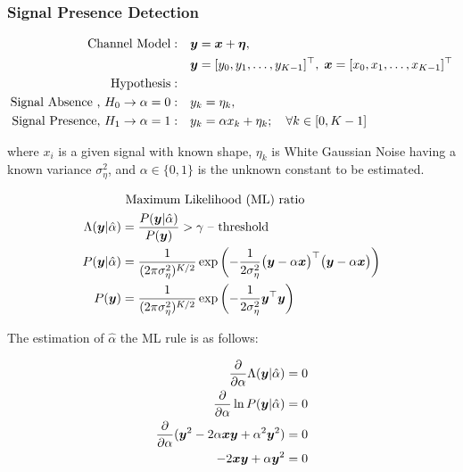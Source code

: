 \documentclass[17pt,a4paper]{extarticle}
\begin{document}
\subsubsection{Signal Presence Detection} 
\begin{linenomath*} 
	\begin{align*}	
		\textrm{Channel~Model}:\quad & {\boldsymbol {y}}= {\boldsymbol {x}} + {\boldsymbol {\eta}},\\
		&{\boldsymbol {y}}=[y_0,y_1,\ldots,y_{K-1}]^{\top},\; 	{\boldsymbol {x}}=[x_0,x_1,\ldots,x_{K-1}]^{\top}\\
		\textrm{Hypothesis}:\quad &\\
		\textrm{Signal~Absence , }H_0 \to \alpha= 0:\quad &y_k = \eta_k,\quad \textrm{}\\
		\textrm{Signal~Presence, }H_1 \to \alpha= 1:\quad &y_k= \alpha x_k + \eta_k; \quad\forall k\in[0,K-1] 
	\end{align*}
\end{linenomath*}
where $x_i$ is a given signal with known shape, $\eta_k$ is White Gaussian Noise having a known variance $\sigma^{2}_\eta$, and $\alpha{\in}\{0,1\}$ is the unknown constant to be estimated.
\begin{linenomath*} 
	\begin{align*}
		&\textrm{ Maximum Likelihood (ML) ratio}\\
		\Lambda ( {\boldsymbol {y}}|\hat{\alpha}) &=
		\frac{P( {\boldsymbol {y}}|\hat{\alpha})}{P( {\boldsymbol {y}})} 
		 > \gamma\textrm{ -- threshold}\\
		 P({\boldsymbol {y}}|\hat{\alpha})&=\frac{1}{(2\pi \sigma^{2}_{\eta})^{K/2}}\exp\left(-\frac{1}{2\sigma^{2}_{\eta}}\big({\boldsymbol {y}}-\alpha{\boldsymbol {x}}\big)^{\top}\big({\boldsymbol {y}}-\alpha{\boldsymbol {x}}\big)\right)\\
		 P({\boldsymbol {y}})&=\frac{1}{(2\pi \sigma^{2}_{\eta})^{K/2}}\exp\left(-\frac{1}{2\sigma^{2}_{\eta}} {\boldsymbol {y}} ^{\top} {\boldsymbol {y}} \right)
	\end{align*}
\end{linenomath*}

The estimation of $\hat{\alpha}$ the ML rule is as follows:
\begin{linenomath*} 
	\begin{align*}
		\frac{\partial }{\partial \alpha}	\Lambda ( {\boldsymbol {y}}|\hat{\alpha})&=0 	\\
		\frac{\partial }{\partial \alpha}\ln P({\boldsymbol {y}}|\hat{\alpha})&=0 	\\
		\frac{\partial }{\partial \alpha}({\boldsymbol {y}}^{2}-2\alpha{\boldsymbol {x}}{\boldsymbol {y}}+\alpha^{2}{\boldsymbol {y}}^{2})&=0\\	
		-2 {\boldsymbol {x}}{\boldsymbol {y}}+\alpha {\boldsymbol {y}}^{2}&=0
	\end{align*}
\end{linenomath*}
\end{document}
